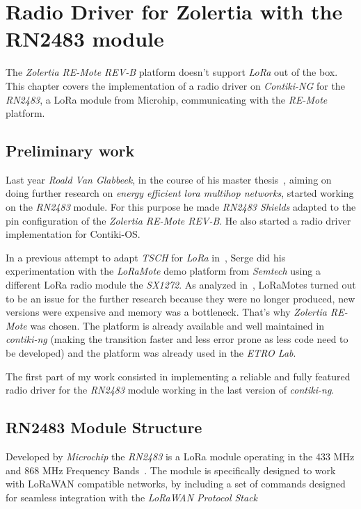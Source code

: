 \chapter{Radio Driver for Zolertia with the RN2483 module\label{section:radio}}


The \emph{Zolertia RE-Mote REV-B} platform doesn't support \emph{LoRa} out of
the box. This chapter covers the implementation of a radio driver on
\emph{Contiki-NG} for the \emph{RN2483}, a LoRa module from Microhip,
communicating with the \emph{RE-Mote} platform.

\section{Preliminary work}

Last year \emph{Roald Van Glabbeek}, in the course of his master thesis~\cite{8847137}, 
aiming on doing further research on \emph{energy efficient lora multihop networks}, 
started working on the \emph{RN2483} module.
For this purpose he made \emph{RN2483 Shields} adapted to the pin
configuration of the \emph{Zolertia RE-Mote REV-B}. He also started a radio driver
implementation for Contiki-OS\@.

In a previous attempt to adapt \emph{TSCH} for \emph{LoRa}
in~\cite{njomgang_2018}, Serge did his experimentation with the \emph{LoRaMote}
demo platform from \emph{Semtech} using a different LoRa radio module the
\emph{SX1272}. 
As analyzed in~\cite{8847137}, LoRaMotes turned out to be an issue for the
further research because they were no longer produced, 
new versions were expensive and memory was a bottleneck.
That's why \emph{Zolertia RE-Mote} was chosen. The platform is already available 
and well maintained in \emph{contiki-ng} (making the transition faster and less
error prone as less code need to be developed) and the platform was already used 
in the \emph{ETRO Lab}.

The first part of my work consisted in implementing a reliable
and fully featured radio driver for the \emph{RN2483} module working in the last
version of \emph{contiki-ng}.

\section{RN2483 Module Structure}

Developed by \emph{Microchip} the \emph{RN2483} is a LoRa module operating in
the 433 MHz and 868 MHz Frequency Bands~\cite{microchip:rn2483}. 
The module is specifically designed to work with LoRaWAN compatible networks, 
by including a set of commands designed for seamless integration with the
\emph{LoRaWAN Protocol Stack}

